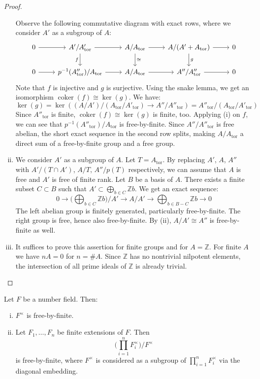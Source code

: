 \begin{proof}
\begin{enumerate}[(i)]
Observe the following commutative diagram with exact rows, where we consider $A'$ as a subgroup of $A$:
\[ \begin{tikzcd}
0 \ar[r]& A'/A'_\text{tor}\ar[r]\ar[d, "f"'] & A/A_\text{tor}\ar[r]\ar[d, "\cong"] & A/(A'+A_\text{tor}) \ar[r]\ar[d, "g"]& 0\\
0 \ar[r] & p^{-1}(A''_\text{tor})/A_\text{tor} \ar[r]& A/A_\text{tor}\ar[r] & A''/A''_\text{tor}\ar[r] & 0
\end{tikzcd} \]
Note that $f$ is injective and $g$ is surjective. Using the snake lemma, we get an isomorphism $\operatorname{coker}(f)\cong \ker(g)$. We have:
\[\ker(g) = \ker( (A/A')/(A_\text{tor}/A'_\text{tor}) \to A''/A''_\text{tor} ) = A''_\text{tor}/(A_\text{tor}/A'_\text{tor})\]
Since $A''_\text{tor}$ is finite, $\operatorname{coker}(f)\cong \ker(g)$ is finite, too. Applying (i) on $f$, we can see that $p^{-1}(A''_\text{tor})/A_\text{tor}$ is free-by-finite. Since $A''/A''_\text{tor}$ is free abelian, the short exact sequence in the second row splits, making $A/A_\text{tor}$ a direct sum of a free-by-finite group and a free group.
\item We consider $A'$ as a subgroup of $A$. Let $T=A_\text{tor}$. By replacing $A'$, $A$, $A''$ with $A'/(T\cap A')$, $A/T$, $A''/p(T)$ respectively, we can assume that $A$ is free and $A'$ is free of finite rank. Let $B$ be a basis of $A$. There exists a finite subset $C\subset B$ such that $A'\subset \bigoplus_{b\in C}\mathbb{Z}b$. We get an exact sequence:
\[ 0 \longrightarrow \Big(\bigoplus_{b\in C} \mathbb{Z}b\Big)\Big/A' \longrightarrow A/A' \longrightarrow \bigoplus_{b\in B -  C}\mathbb{Z}b \longrightarrow 0 \]
The left abelian group is finitely generated, particularly free-by-finite. The right group is free, hence also free-by-finite. By (ii), $A/A'\cong A''$ is free-by-finite as well.
\item It suffices to prove this assertion for finite groups and for $A=\mathbb{Z}$. For finite $A$ we have $nA = 0$ for $n = \#A$. Since $\mathbb{Z}$ has no nontrivial nilpotent elements, the intersection of all prime ideals of $\mathbb{Z}$ is already trivial. \qedhere
\end{enumerate}
\end{proof}

\begin{lemma}\label{5.3}
Let $F$ be a number field. Then:
\begin{enumerate}[(i)]
\item $F^\times$ is free-by-finite.
\item Let $F_1,\ldots,F_n$ be finite extensions of $F$. Then 
\[\Big(\prod_{i=1}^{n}F_i^\times\Big)/F^\times\] 
is free-by-finite, where $F^\times$ is considered as a subgroup of $\prod_{i=1}^{n}F_i^\times$ via the diagonal embedding.
\end{enumerate}
\end{lemma}

